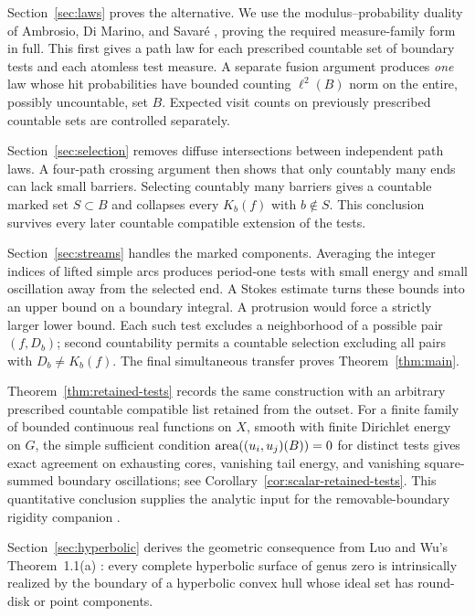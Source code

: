 Section~\ref{sec:laws} proves the alternative. We use the
modulus--probability duality of Ambrosio, Di Marino, and Savar\'e
\cite{AmbrosioDiMarinoSavare2015}, proving the required measure-family
form in full. This first gives a path law for each prescribed countable
set of boundary tests and each atomless test measure. A separate fusion
argument produces \emph{one} law whose hit probabilities have bounded
counting $\ell^2(B)$ norm on the entire, possibly uncountable, set $B$.
Expected visit counts on previously prescribed countable sets are
controlled separately.

Section~\ref{sec:selection} removes diffuse intersections between
independent path laws. A four-path crossing argument then shows that
only countably many ends can lack small barriers. Selecting countably
many barriers gives a countable marked set $S\subset B$ and collapses
every $K_b(f)$ with $b\notin S$. This conclusion survives every later
countable compatible extension of the tests.

Section~\ref{sec:streams} handles the marked components. Averaging the
integer indices of lifted simple arcs produces period-one tests with
small energy and small oscillation away from the selected end. A
Stokes estimate turns these bounds into an upper bound on a boundary
integral. A protrusion would force a strictly larger lower bound.
Each such test excludes a neighborhood of a possible pair $(f,D_b)$;
second countability permits a countable selection excluding all pairs
with $D_b\ne K_b(f)$. The final simultaneous transfer proves
Theorem~\ref{thm:main}.

Theorem~\ref{thm:retained-tests} records the same construction with
an arbitrary prescribed countable compatible list retained from the outset.
For a finite family of bounded continuous real functions on $X$,
smooth with finite
Dirichlet energy on $G$, the simple sufficient condition
$\operatorname{area}((u_i,u_j)(B))=0$ for distinct tests gives exact agreement on
exhausting cores, vanishing tail energy, and vanishing square-summed
boundary oscillations; see Corollary~\ref{cor:scalar-retained-tests}.
This quantitative conclusion supplies the analytic input for the
removable-boundary rigidity companion \cite{OpenAIRigidity2026}.

Section~\ref{sec:hyperbolic} derives the geometric consequence from
Luo and Wu's Theorem~1.1(a) \cite{LuoWu2024}: every complete hyperbolic
surface of genus zero is intrinsically realized by the boundary of a
hyperbolic convex hull whose ideal set has round-disk or point components.

